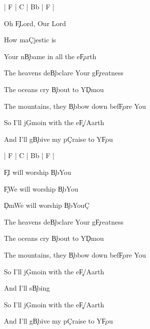 \documentclass[9pt]{extarticle}
\begin{document}
\bsong

\bi
| F | C | Bb | F |
\ei

\bv[2]
Oh \c{F}Lord, Our Lord

How ma\c{C}jestic is

Your n\c{Bb}ame in all the e\c{F}arth
\ev

\bc
The heavens de\c{Bb}clare Your g\c{F}reatness

The oceans cry \c{Bb}out to Y\c{Dm}ou

The mountains, they \c{Bb}bow down bef\c{F}ore You

So I'll j\c{Gm}oin with the e\c{F/A}arth

And I'll g\c{Bb}ive my p\c{C}raise to Y\c{F}ou
\ec

\bin
| F | C | Bb | F |
\ein



\bb[4]
\c{F}I will worship \c{Bb}You
\eb

\bb
\c{F}We will worship \c{Bb}You

\c{Dm}We will worship \c{Bb}You\c{C}
\eb

\bc
The heavens de\c{Bb}clare Your g\c{F}reatness

The oceans cry \c{Bb}out to Y\c{Dm}ou

The mountains, they \c{Bb}bow down bef\c{F}ore You

So I'll j\c{Gm}oin with the e\c{F/A}arth

And I'll s\c{Bb}ing
\ec


\bo[2]
So I'll j\c{Gm}oin with the e\c{F/A}arth

And I'll g\c{Bb}ive my p\c{C}raise to Y\c{F}ou
\eo

\esong
\end{document}
